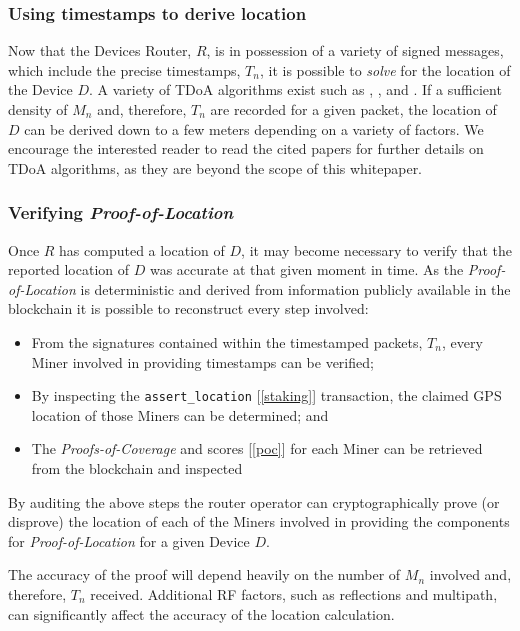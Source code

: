\documentclass[10pt, nonatbib, nocopyrightspace, reprint]{sigplanconf}
\newcommand{\secref}[1]{[\autoref{#1}]}
\begin{document}
\subsubsection{Using timestamps to derive location}

Now that the Devices Router, $R$, is in possession of a variety of signed messages, which include the precise timestamps, $T_n$, it is possible to \emph{solve} for the location of the Device $D$. A variety of TDoA algorithms exist such as \cite{recurrent-tdoa}, \cite{acoustic-tdoa}, \cite{efficient-tdoa} and \cite{async-tdoa}. If a sufficient density of $M_n$ and, therefore, $T_n$ are recorded for a given packet, the location of $D$ can be derived down to a few meters depending on a variety of factors. We encourage the interested reader to read the cited papers for further details on TDoA algorithms, as they are beyond the scope of this whitepaper.

\subsubsection{Verifying \emph{Proof-of-Location}}

Once $R$ has computed a location of $D$, it may become necessary to verify that the reported location of $D$ was accurate at that given moment in time. As the \emph{Proof-of-Location} is deterministic and derived from information publicly available in the blockchain it is possible to reconstruct every step involved:

\begin{itemize}
  \item From the signatures contained within the timestamped packets, $T_n$, every Miner involved in providing timestamps can be verified;
  \item By inspecting the \verb|assert_location| \secref{staking} transaction, the claimed GPS location of those Miners can be determined; and
  \item The \emph{Proofs-of-Coverage} and scores \secref{poc} for each Miner can be retrieved from the blockchain and inspected
\end{itemize}

By auditing the above steps the router operator can cryptographically prove (or disprove) the location of each of the Miners involved in providing the components for \emph{Proof-of-Location} for a given Device $D$.

The accuracy of the proof will depend heavily on the number of $M_n$ involved and, therefore, $T_n$ received. Additional RF factors, such as reflections and multipath, can significantly affect the accuracy of the location calculation.
\end{document}
